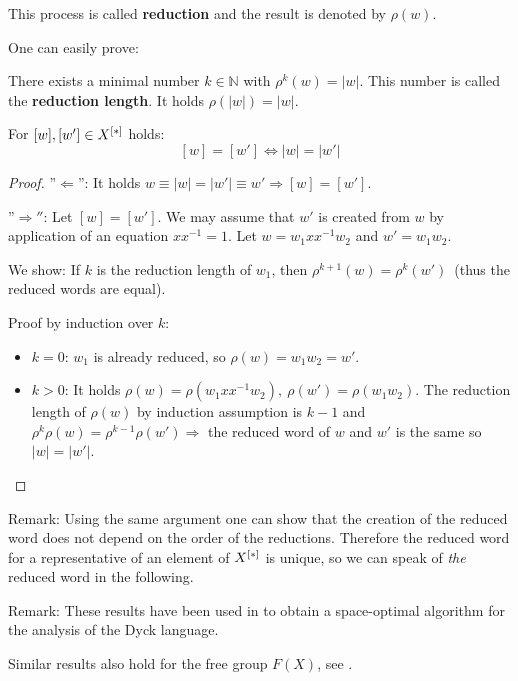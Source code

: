 This process is called {\bf reduction} and the result is denoted by $\rho(w)$.

One can easily prove:

\begin{lemma}
There exists a minimal number $k \in \mathbb{N}$ with $\rho^k(w) = |w|$. This
number is called the {\bf reduction length}. It holds $\rho(|w|) = |w|$.
\end{lemma}

\bigskip
\begin{lemma}
For $[w], [w'] \in \mbox{${X}^{[*]}$}$ holds:
\[ [w] = [w'] \iff |w| = |w'| \]
\end{lemma}

\begin{proof}
''$\Leftarrow$'': It holds $w \equiv |w| = |w'| \equiv w' \Rightarrow [w] =
[w']$.

''$\Rightarrow''$: Let $[w] = [w']$. We may assume that $w'$ is created from $w$
by application of an equation $x x^{-1} = 1$. Let $w = w_1 x x^{-1} w_2$ and $w' = w_1 w_2$.

We show: If $k$ is the reduction length of $w_1$, then $\rho^{k+1}(w) =
\rho^k(w')$\ (thus the reduced words are equal).

Proof by induction over $k$:
\begin{itemize}
  \item  $k = 0$: $w_1$ is already reduced, so $\rho(w) = w_1 w_2 = w'$.
  \item $k > 0$: It holds $\rho(w) = \rho(w_1 x x^{-1} w_2),\ \rho(w') = \rho(w_1
w_2)$. The reduction length of $\rho(w)$ by induction assumption is $k-1$ and
$\rho^k \rho(w) = \rho^{k-1}\rho(w') \Rightarrow$ the reduced word of $w$ and
$w'$ is the same so $|w| = |w'|$.
\end{itemize}
\end{proof}

Remark: Using the same argument one can show that the creation of the reduced
word does not depend on the order of the reductions. Therefore the reduced word
for a representative of an element of $\mbox{${X}^{[*]}$}$ is unique, so we can speak of {\em the} 
reduced word in the following.

Remark: These results have been used in \cite{HotzMesserschmidt} to obtain a
space-optimal algorithm for the analysis of the Dyck language.

Similar results also hold for the free group $F(X)$, see \cite{CrowellFox}.
